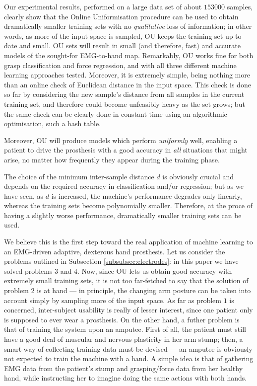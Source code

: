 Our experimental results, performed on a large data set of about
$153000$ samples, clearly show that the Online Uniformisation
procedure can be used to obtain dramatically smaller training sets
with no \emph{qualitative} loss of information; in other words, as
more of the input space is sampled, OU keeps the training set
up-to-date and small. OU sets will result in small (and therefore,
fast) and accurate models of the sought-for EMG-to-hand
map. Remarkably, OU works fine for both grasp classification and force
regression, and with all three different machine learning approaches
tested. Moreover, it is extremely simple, being nothing more than an
online check of Euclidean distance in the input space. This check is
done so far by considering the new sample's distance from all samples
in the current training set, and therefore could become unfeasibly
heavy as the set grows; but the same check can be clearly done in
constant time using an algorithmic optimisation, such a hash table.

Moreover, OU will produce models which perform \emph{uniformly} well,
enabling a patient to drive the prosthesis with a good accuracy in
\emph{all} situations that might arise, no matter how frequently they
appear during the training phase.

The choice of the minimum inter-sample distance $d$ is obviously
crucial and depends on the required accuracy in classification and/or
regression; but as we have seen, as $d$ is increased, the machine's
performance degrades only linearly, whereas the training sets become
polynomially smaller. Therefore, at the proce of having a slightly
worse performance, dramatically smaller training sets can be used.

We believe this is the first step toward the real application of
machine learning to an EMG-driven adaptive, dexterous hand
prosthesis. Let us consider the problems outlined in Subsection
\ref{subsubsec:electrodes}: in this paper we have solved problems
$3$ and $4$. Now, since OU lets us obtain good accuracy with extremely
small training sets, it is not too far-fetched to say that the
solution of problem $2$ is at hand --- in principle, the changing arm
posture can be taken into account simply by sampling more of the input
space. As far as problem $1$ is concerned, inter-subject usability is
really of lesser interest, since one patient only is supposed to ever
wear a prosthesis. On the other hand, a futher problem is that of
training the system upon an amputee. First of all, the patient must
still have a good deal of muscular and nervous plasticity in her arm
stump; then, a smart way of collecting training data must be
devised --- an amputee is obviously not expected to train the machine
with a hand. A simple idea is that of gathering EMG data from the
patient's stump and grasping/force data from her healthy hand, while
instructing her to imagine doing the same actions with both hands.

